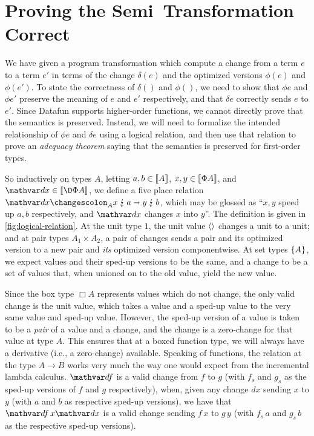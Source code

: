 \section{Proving the Semi\naive\ Transformation Correct}

We have given a program transformation which compute a change from a
term $e$ to a term $e'$ in terms of the change $\delta(e)$ and the
optimized versions $\phi(e)$ and $\phi(e')$. To state the correctness
of $\delta()$ and $\phi()$, we need to show that $\phi e$ and
$\phi e'$ preserve the meaning of $e$ and $e'$ respectively, and that
$\delta e$ correctly sends $e$ to $e'$.
%
Since Datafun supports higher-order functions, we cannot directly
prove that the semantics is preserved. Instead, we will need to
formalize the intended relationship of $\phi e$ and $\delta e$ using a
logical relation, and then use that relation to prove an
\emph{adequacy theorem} saying that the semantics is preserved for
first-order types.

So inductively on types $A$, letting $a,b \in \llbracket{A}\rrbracket$,
$x,y \in \llbracket{\Phi A}\rrbracket$, and $\dx \in \den{\DP A}$, we define a five
place relation $\weirdat{A}{\dx}{x}{a}{y}{b}$, which may be glossed as
``$x,y$ speed up $a,b$ respectively, and $\dx$ changes $x$ into $y$''.
The definition is given in \cref{fig:logical-relation}. At the
unit type  $1$, the unit value $\langle{}\rangle$ changes a unit to a unit; and at pair
types $A_1 \times A_2$, a pair of changes sends a pair and its optimized version to
a new pair and \emph{its} optimized version componentwise. At set
types $\{{A}\}$, we expect values and their sped-up versions to be the same,
and a change to be a set of values that, when unioned on to the
old value, yield the new value.

Since the box type $\Box A$ represents values which do not change, the
only valid change is the unit value, which takes a value and a sped-up
value to the very same value and sped-up value. However, the sped-up
version of a value is taken to be a \emph{pair} of a value and a
change, and the change is a zero-change for that value at type $A$.
This ensures that at a boxed function type, we will always have a
derivative (i.e., a zero-change) available. 
%
Speaking of functions, the relation at the type $A \to B$ works very
much the way one would expect from the incremental lambda calculus.
$\df$ is a valid change from $f$ to $g$ (with $f_s$ and $g_s$ as the
sped-up versions of $f$ and $g$ respectively), when, given any
change $dx$ sending $x$ to $y$ (with $a$ and $b$ as respective sped-up
versions), we have that $\df\,x\dx$ is a valid change sending
$f\,x$ to $g\,y$ (with $f_s\,a$ and $g_s\,b$ as the respective
sped-up versions). 


